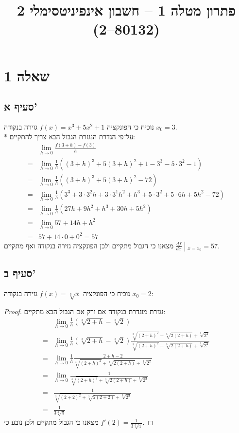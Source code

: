 
\title{פתרון מטלה 1 – חשבון אינפיניטסימלי 2 (80132--2)}


\maketitle
\maketitleprint{}

\section{שאלה 1}
\subsection{סעיף א'}
נוכיח כי הפונקציה $f(x) = x^3 + 5x^2 + 1$ גזירה בנקודה $x_0 = 3$. \\*
על־פי הגדרת הנגזרת הגבול הבא צריך להתקיים:
\begin{align*}
	& \lim_{h \to 0} \frac{f(3 + h) - f(3)}{h} \\
	= & \lim_{h \to 0} \frac{1}{h} ({(3 + h)}^3 + 5{(3 + h)}^2 + 1 - 3^3 - 5 \cdot 3^2 - 1) \\
	= & \lim_{h \to 0} \frac{1}{h} ({(3 + h)}^3 + 5{(3 + h)}^2 - 72) \\
	= & \lim_{h \to 0} \frac{1}{h} (3^3 + 3 \cdot 3^2 h + 3 \cdot 3^1 h^2 + h^3 + 5\cdot 3^2 + 5 \cdot 6h + 5h^2 - 72) \\
	= & \lim_{h \to 0} \frac{1}{h} (27 h + 9 h^2 + h^3 + 30h + 5h^2) \\
	= & \lim_{h \to 0} 57 + 14 h + h^2 \\
	= & 57 + 14 \cdot 0 + 0^2 = 57
\end{align*}
מצאנו כי הגבול מתקיים ולכן הפונקציה גזירה בנקודה ואף מתקיים $\left. \frac{df}{dx}\middle\vert_{x = x_0}\right. = 57$.

\subsection{סעיף ב'}
נוכיח כי הפונקציה $f(x) = \sqrt[3]{x}$ גזירה בנקודה $x_0 = 2$:
\begin{proof}
	נגזרת מוגדרת בנקודה אם ורק אם הגבול הבא מתקיים:
	\begin{align*}
		& \lim_{h \to 0} \frac{1}{h} \left(\sqrt[3]{2 + h} - \sqrt[3]{2}\right) \\
		= & \lim_{h \to 0} \frac{1}{h} \left(\sqrt[3]{2 + h} - \sqrt[3]{2}\right) \frac{\sqrt[3]{{(2 + h)}^2} + \sqrt[3]{2(2 + h)} + \sqrt[3]{2^2}}{\sqrt[3]{{(2 + h)}^2} + \sqrt[3]{2(2 + h)} + \sqrt[3]{2^2}} \\
		= & \lim_{h \to 0} \frac{1}{h} \frac{2 + h - 2}{\sqrt[3]{{(2 + h)}^2} + \sqrt[3]{2(2 + h)} + \sqrt[3]{2^2}} \\
		= & \lim_{h \to 0} \frac{1}{\sqrt[3]{{(2 + h)}^2} + \sqrt[3]{2(2 + h)} + \sqrt[3]{2^2}} \\
		= & \frac{1}{\sqrt[3]{{(2 + 2)}^2} + \sqrt[3]{2(2 + 2)} + \sqrt[3]{2^2}} \\
		= & \frac{1}{3 \sqrt[3]{4}}
	\end{align*}
	מצאנו כי הגבול מתקיים ולכן נובע כי $f'(2) = \frac{1}{3 \sqrt[3]{4}}$.
\end{proof}


